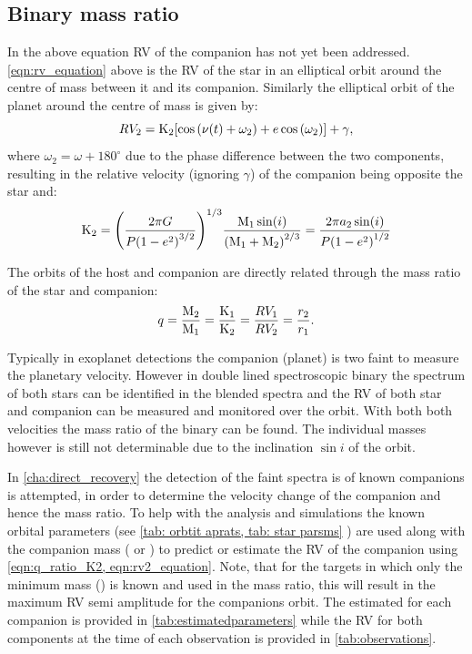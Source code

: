 \subsection{Binary mass ratio}
In the above equation RV of the companion has not yet been addressed. 
\cref{eqn:rv_equation} above is the RV of the star in an elliptical orbit around the centre of mass between it and its companion. Similarly the elliptical orbit of the planet around the centre of mass is given by:
\begin{equation}
    {RV_{2}} = \textrm{K}_{2} [\cos{(\nu(t) + \omega_{2})} + e\cos{(\omega_{2})}] + \gamma, \label{eqn:rv2_equation}
\end{equation}
where \(\omega_{2} = \omega + 180^\circ\) due to the phase difference between the two components, resulting in the relative velocity (ignoring $\gamma$) of the companion being opposite the star and:
\begin{equation}
    \textrm{K}_{2}  = {\left(  \frac{2 \pi G}{P{(1 - {e}^{2})}^{3/2}} \right)}^{1/3} \frac{\textrm{M}_{1} \sin(i)}{{(\textrm{M}_{1} + \textrm{M}_{2})}^{2/3}} = \frac{2 \pi a_2 \sin(i)}{P{(1 - {e}^{2})}^{1/2}} \label{eqn:ktwo}
\end{equation}

The orbits of the host and companion are directly related through the mass ratio of the star and companion:
\begin{equation}
q = \frac{\textrm{M}_{2}}{\textrm{M}_{1}} = \frac{\textrm{K}_{1}}{\textrm{K}_{2}} = \frac{RV_{1}}{RV_{2}} = \frac{r_2}{r_1} \label{eqn:q_ratio_K2}.
\end{equation}

Typically in exoplanet detections the companion (planet) is two faint to measure the planetary velocity. However in double lined spectroscopic binary the spectrum of both stars can be identified in the blended spectra and the RV of both star and companion can be measured and monitored over the orbit. With both both velocities the mass ratio of the binary can be found. The individual masses however is still not determinable due to the inclination $\sin{i}$ of the orbit. 

In \cref{cha:direct_recovery} the detection of the faint spectra is of known companions is attempted, in order to determine the velocity change of the companion and hence the mass ratio. To help with the analysis and simulations the known orbital parameters (see \cref{tab: orbtit aprats, tab: star parsms} ) are used along with the companion mass ( \Mtwo{} or \Mtwosini{}) to predict or estimate the RV of the companion using \cref{eqn:q_ratio_K2, eqn:rv2_equation}.
Note, that for the targets in which only the minimum mass (\Mtwosini) is known and used in the mass ratio, this will result in the maximum {RV} semi amplitude for the companions orbit.
The estimated \Ktwo{} for each companion is provided in \cref{tab:estimatedparameters} while the {RV} for both components at the time of each observation is provided in \cref{tab:observations}.









